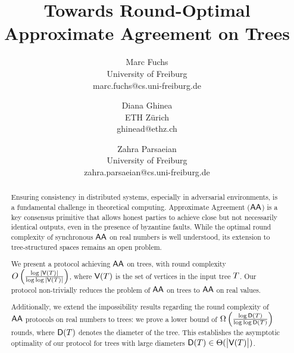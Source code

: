 \documentclass[11pt,USenglish,thm-restate]{article}
\title{Towards Round-Optimal Approximate Agreement on Trees}
\author{
    \begin{minipage}{0.33\textwidth}
        \centering
        Marc Fuchs\\
        \small University of Freiburg\\
        \small marc.fuchs@cs.uni-freiburg.de
    \end{minipage}
    \and
    \begin{minipage}{0.23\textwidth}
        \centering
        Diana Ghinea\\
        \small ETH Z\"{u}rich\\
        \small ghinead@ethz.ch
    \end{minipage}
    \and
    \begin{minipage}{0.33\textwidth}
        \centering
        Zahra Parsaeian\\
        \small University of Freiburg\\
        \small zahra.parsaeian@cs.uni-freiburg.de
    \end{minipage}
}
\date{}
\begin{document}
\maketitle

\fontsize{11pt}{13pt}\selectfont 
\singlespacing


\begin{abstract}
\normalsize
Ensuring consistency in distributed systems, especially in adversarial environments, is a fundamental challenge in theoretical computing. Approximate Agreement ($\textsf{AA}$) is a key consensus primitive that allows honest parties to achieve close but not necessarily identical outputs, even in the presence of byzantine faults. While the optimal round complexity of synchronous $\textsf{AA}$ on real numbers is well understood, its extension to tree-structured spaces remains an open problem.

We present a protocol achieving $\textsf{AA}$ on trees, with round complexity 
$
O\left(\frac{\log |\textsf{V}(T)|}{\log \log |\textsf{V}(T)|} \right)
$, where $\textsf{V}(T)$ is the set of vertices in the input tree $T$. Our protocol non-trivially reduces the problem of $\textsf{AA}$ on trees to $\textsf{AA}$ on real values.

Additionally, we extend the impossibility results regarding the round complexity of $\textsf{AA}$ protocols on real numbers to trees: we prove a lower bound of $
\Omega\left(\frac{\log \textsf{D}(T)}{\log \log \textsf{D}(T)} \right)
$
rounds, where $\textsf{D}(T)$ denotes the diameter of the tree. This establishes the asymptotic optimality of our protocol for trees with large diameters $\textsf{D}(T) \in \Theta(\big\lvert\textsf{V}(T)\big\rvert)$. 

\end{abstract}







\newpage




\newpage

\end{document}
